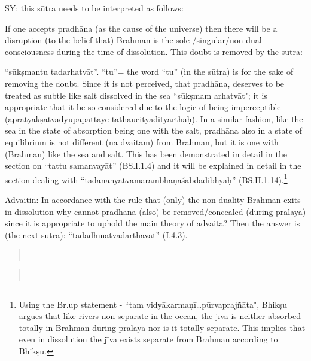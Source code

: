 SY: this sūtra needs to be interpreted as follows:

If one accepts pradhāna (as the cause of the universe) then there will be a disruption (to the belief that) Brahman is the sole /singular/non-dual consciousness during the time of dissolution. This doubt is removed by the sūtra: 

“sūkṣmantu tadarhatvāt”. “tu”= the word “tu” (in the sūtra) is for the sake of removing the doubt. Since it is not perceived, that pradhāna, deserves to be treated as subtle like salt dissolved in the sea ``sūkṣmam arhatvāt"; it is appropriate that it be so considered due to the logic of being imperceptible  (apratyakṣatvādyupapattaye tathaucityādityarthaḥ). In a similar fashion, like the sea in the state of absorption being one with the salt, pradhāna also in a state of equilibrium is not different (na dvaitam) from Brahman, but it is one with (Brahman) like the sea and salt. This has been demonstrated in detail in the section on “tattu samanvayāt” (BS.I.1.4) and it will be explained in detail in the section dealing with “tadananyatvamārambhaṇaśabdādibhyaḥ” (BS.II.1.14).\footnote{Using the Br.up statement - ``tam vidyākarmaṇī…pūrvaprajñāta", Bhikṣu argues that like rivers non-separate in the ocean, the jīva is neither absorbed totally in Brahman during pralaya nor is it totally separate. This implies that even in dissolution the jīva exists separate from Brahman according to Bhikṣu.}

Advaitin: In accordance with the rule that (only) the non-duality Brahman exits in dissolution why cannot pradhāna (also) be removed/con\-cealed (during pralaya) since it is appropriate to uphold the main theory of advaita? Then the answer is (the next sūtra): “tadadhīnatvādarthavat” (I.4.3).

\textbf{}


\begin{verse}
\\
\end{verse}


\begin{verse}
\\
\end{verse}

